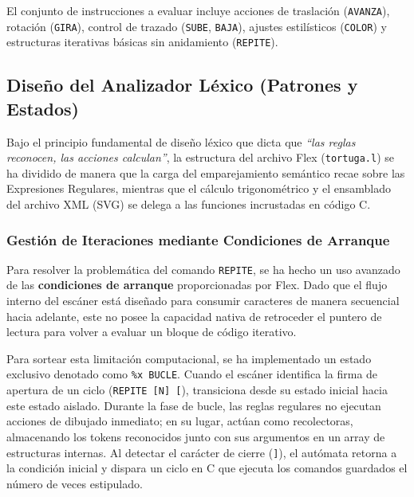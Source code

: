 \documentclass[12pt,a4paper]{article}
\begin{document}
El conjunto de instrucciones a evaluar incluye acciones de traslación (\texttt{AVANZA}), rotación (\texttt{GIRA}), control de trazado (\texttt{SUBE}, \texttt{BAJA}), ajustes estilísticos (\texttt{COLOR}) y estructuras iterativas básicas sin anidamiento (\texttt{REPITE}).

\subsection{Diseño del Analizador Léxico (Patrones y Estados)}
Bajo el principio fundamental de diseño léxico que dicta que \textit{``las reglas reconocen, las acciones calculan''}, la estructura del archivo Flex (\texttt{tortuga.l}) se ha dividido de manera que la carga del emparejamiento semántico recae sobre las Expresiones Regulares, mientras que el cálculo trigonométrico y el ensamblado del archivo XML (SVG) se delega a las funciones incrustadas en código C.

\subsubsection{Gestión de Iteraciones mediante Condiciones de Arranque}
Para resolver la problemática del comando \texttt{REPITE}, se ha hecho un uso avanzado de las \textbf{condiciones de arranque} proporcionadas por Flex. Dado que el flujo interno del escáner está diseñado para consumir caracteres de manera secuencial hacia adelante, este no posee la capacidad nativa de retroceder el puntero de lectura para volver a evaluar un bloque de código iterativo.

Para sortear esta limitación computacional, se ha implementado un estado exclusivo denotado como \texttt{\%x BUCLE}. Cuando el escáner identifica la firma de apertura de un ciclo (\texttt{REPITE [N] [}), transiciona desde su estado inicial hacia este estado aislado. Durante la fase de bucle, las reglas regulares no ejecutan acciones de dibujado inmediato; en su lugar, actúan como recolectoras, almacenando los tokens reconocidos junto con sus argumentos en un array de estructuras internas. Al detectar el carácter de cierre (\texttt{]}), el autómata retorna a la condición inicial y dispara un ciclo en C que ejecuta los comandos guardados el número de veces estipulado.
\end{document}
